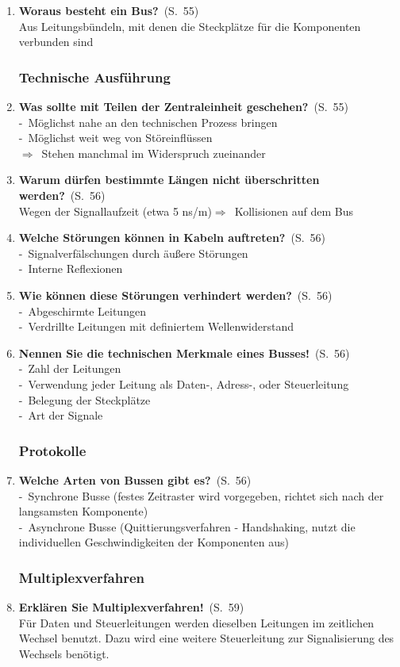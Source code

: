 \documentclass[a4paper,12pt]{article}
\newcommand{\question}[3]{\pagebreak[3]\item {\textbf{#1?}}\ (S.\ #2)#3}
\newcommand{\statement}[3]{\pagebreak[3]\item {\textbf{#1!}}\ (S.\ #2)#3}
\newcommand{\catchword}[1]{\\-\ #1}
\newcommand{\normaltext}[1]{\\#1}
\newcommand{\result}[1]{\\$\Rightarrow$\ #1}
\newcommand{\resultol}[1]{$\Rightarrow$\ #1}
\newcommand{\page}[1]{#1}
\begin{document}
\begin{enumerate}
  \question{Woraus besteht ein Bus}{\page{55}}
  {
    \normaltext{Aus Leitungsbündeln, mit denen die Steckplätze für die Komponenten verbunden sind}
  }

  \subsubsection{Technische Ausführung}

  \question{Was sollte mit Teilen der Zentraleinheit geschehen}{\page{55}}
  {
    \catchword{Möglichst nahe an den technischen Prozess bringen}
    \catchword{Möglichst weit weg von Störeinflüssen}
    \result{Stehen manchmal im Widerspruch zueinander}
  }

  \question{Warum dürfen bestimmte Längen nicht überschritten werden}{\page{56}}
  {
    \normaltext{Wegen der Signallaufzeit (etwa 5 ns/m)\resultol{Kollisionen auf dem Bus}}
  }

  \question{Welche Störungen können in Kabeln auftreten}{\page{56}}
  {
    \catchword{Signalverfälschungen durch äußere Störungen}
    \catchword{Interne Reflexionen}
  }

  \question{Wie können diese Störungen verhindert werden}{\page{56}}
  {
    \catchword{Abgeschirmte Leitungen}
    \catchword{Verdrillte Leitungen mit definiertem Wellenwiderstand}
  }

  \statement{Nennen Sie die technischen Merkmale eines Busses}{\page{56}}
  {
    \catchword{Zahl der Leitungen}
    \catchword{Verwendung jeder Leitung als Daten-, Adress-, oder Steuerleitung}
    \catchword{Belegung der Steckplätze}
    \catchword{Art der Signale}
  }

  \subsubsection{Protokolle}

  \question{Welche Arten von Bussen gibt es}{\page{56}}
  {
    \catchword{Synchrone Busse (festes Zeitraster wird vorgegeben, richtet sich nach der 
               langsamsten Komponente)}
    \catchword{Asynchrone Busse (Quittierungsverfahren - Handshaking, nutzt die individuellen
               Geschwindigkeiten der Komponenten aus)}
  }

  \subsubsection{Multiplexverfahren}

  \statement{Erklären Sie Multiplexverfahren}{\page{59}}
  {
    \normaltext{Für Daten und Steuerleitungen werden dieselben Leitungen im zeitlichen Wechsel
                benutzt. Dazu wird eine weitere Steuerleitung zur Signalisierung des Wechsels benötigt.}
  }


\end{enumerate}
\end{document}
